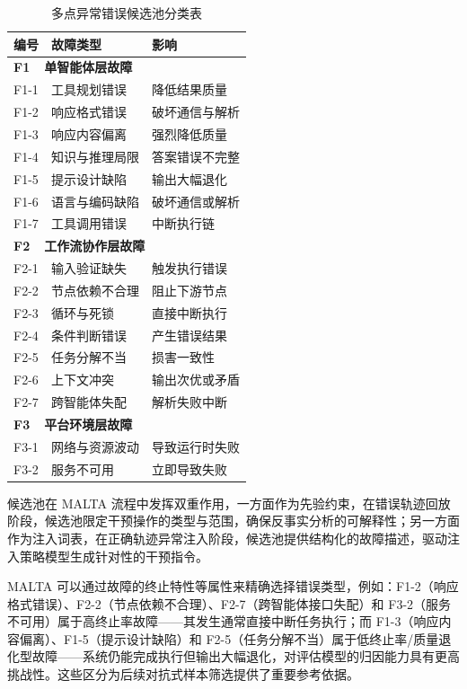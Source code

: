 \begin{table}[H]
\centering
\caption{多点异常错误候选池分类表}
\label{tab:fault_taxonomy}
\begin{tabular}{p{1.5cm} p{4.5cm} p{4.5cm}}
\hline
\textbf{编号} & \textbf{故障类型} & \textbf{影响} \\
\hline
\multicolumn{3}{l}{\textbf{F1~~单智能体层故障}} \\
\hline
F1-1 & 工具规划错误 & 降低结果质量 \\[3pt]
F1-2 & 响应格式错误 & 破坏通信与解析 \\[3pt]
F1-3 & 响应内容偏离 & 强烈降低质量 \\[3pt]
F1-4 & 知识与推理局限 & 答案错误不完整 \\[3pt]
F1-5 & 提示设计缺陷 & 输出大幅退化 \\[3pt]
F1-6 & 语言与编码缺陷 & 破坏通信或解析 \\[3pt]
F1-7 & 工具调用错误 & 中断执行链 \\[3pt]
\hline
\multicolumn{3}{l}{\textbf{F2~~工作流协作层故障}} \\
\hline
F2-1 & 输入验证缺失 & 触发执行错误 \\[3pt]
F2-2 & 节点依赖不合理 & 阻止下游节点 \\[3pt]
F2-3 & 循环与死锁 & 直接中断执行 \\[3pt]
F2-4 & 条件判断错误 & 产生错误结果 \\[3pt]
F2-5 & 任务分解不当 & 损害一致性 \\[3pt]
F2-6 & 上下文冲突 & 输出次优或矛盾 \\[3pt]
F2-7 & 跨智能体失配 & 解析失败中断 \\[3pt]
\hline
\multicolumn{3}{l}{\textbf{F3~~平台环境层故障}} \\
\hline
F3-1 & 网络与资源波动 & 导致运行时失败 \\[3pt]
F3-2 & 服务不可用 & 立即导致失败 \\[3pt]
\hline
\end{tabular}
\end{table}

候选池在 MALTA 流程中发挥双重作用，一方面作为先验约束，在错误轨迹回放阶段，候选池限定干预操作的类型与范围，确保反事实分析的可解释性；另一方面作为注入词表，在正确轨迹异常注入阶段，候选池提供结构化的故障描述，驱动注入策略模型生成针对性的干预指令。
 
MALTA 可以通过故障的终止特性等属性来精确选择错误类型，例如：F1-2（响应格式错误）、F2-2（节点依赖不合理）、F2-7（跨智能体接口失配）和 F3-2（服务不可用）属于高终止率故障——其发生通常直接中断任务执行；而 F1-3（响应内容偏离）、F1-5（提示设计缺陷）和 F2-5（任务分解不当）属于低终止率/质量退化型故障——系统仍能完成执行但输出大幅退化，对评估模型的归因能力具有更高挑战性。这些区分为后续对抗式样本筛选提供了重要参考依据。

